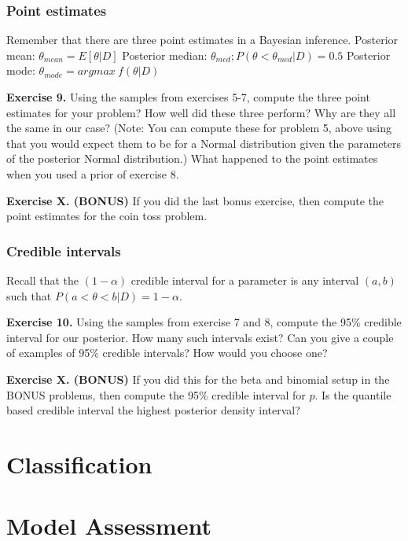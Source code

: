\documentclass[
]{book}
\begin{document}
\hypertarget{point-estimates}{%
\subsection{Point estimates}\label{point-estimates}}

Remember that there are three point estimates in a Bayesian inference.
Posterior mean: \(\theta_{mean} = E[\theta|D]\)
Posterior median: \(\theta_{med}; P(\theta < \theta_{med} | D) = 0.5\)
Posterior mode: \(\theta_{mode} = argmax~f(\theta | D)\)

\textbf{Exercise 9.} Using the samples from exercises 5-7, compute the three point estimates for your problem? How well did these three perform? Why are they all the same in our case? (Note: You can compute these for problem 5, above using that you would expect them to be for a Normal distribution given the parameters of the posterior Normal distribution.) What happened to the point estimates when you used a prior of exercise 8.

\textbf{Exercise X. (BONUS)} If you did the last bonus exercise, then compute the point estimates for the coin toss problem.

\hypertarget{credible-intervals}{%
\subsection{Credible intervals}\label{credible-intervals}}

Recall that the \((1-\alpha)\) credible interval for a parameter is any interval \((a, b)\) such that \(P(a < \theta < b | D) = 1-\alpha\).

\textbf{Exercise 10.} Using the samples from exercise 7 and 8, compute the 95\% credible interval for our posterior. How many such intervals exist? Can you give a couple of examples of 95\% credible intervals? How would you choose one?

\textbf{Exercise X. (BONUS)} If you did this for the beta and binomial setup in the BONUS problems, then compute the 95\% credible interval for \(p\). Is the quantile based credible interval the highest posterior density interval?

\hypertarget{classification}{%
\chapter{Classification}\label{classification}}

\hypertarget{model-assessment}{%
\chapter{Model Assessment}\label{model-assessment}}
\end{document}
